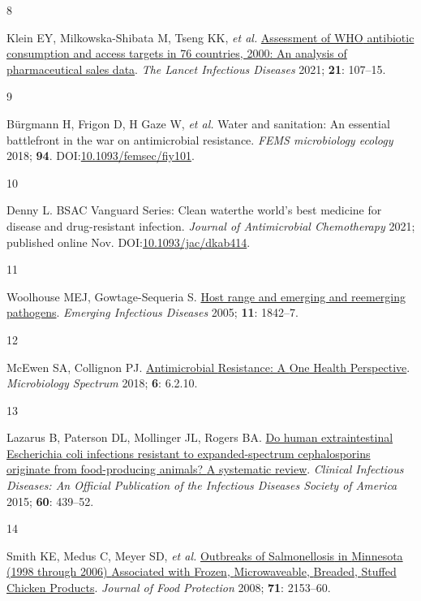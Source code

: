 \documentclass[
]{book}
\newlength{\cslhangindent}
\newlength{\csllabelwidth}
\newlength{\cslentryspacingunit} %
\newenvironment{CSLReferences}[2] %
 {%
  \setlength{\parindent}{0pt}
  \ifodd #1
  \let\oldpar\par
  \def\par{\hangindent=\cslhangindent\oldpar}
  \fi
  \setlength{\parskip}{#2\cslentryspacingunit}
 }%
 {}
\newcommand{\CSLLeftMargin}[1]{\parbox[t]{\csllabelwidth}{#1}}
\newcommand{\CSLRightInline}[1]{\parbox[t]{\linewidth - \csllabelwidth}{#1}\break}
\begin{document}
\begin{CSLReferences}{0}{0}
\leavevmode{}%
\CSLLeftMargin{8 }
\CSLRightInline{Klein EY, Milkowska-Shibata M, Tseng KK, \emph{et al.} \href{https://doi.org/10.1016/S1473-3099(20)30332-7}{Assessment of {WHO} antibiotic consumption and access targets in 76 countries, 2000\textendash 15: An analysis of pharmaceutical sales data}. \emph{The Lancet Infectious Diseases} 2021; \textbf{21}: 107--15.}

\leavevmode{}%
\CSLLeftMargin{9 }
\CSLRightInline{Bürgmann H, Frigon D, H Gaze W, \emph{et al.} Water and sanitation: An essential battlefront in the war on antimicrobial resistance. \emph{FEMS microbiology ecology} 2018; \textbf{94}. DOI:\href{https://doi.org/10.1093/femsec/fiy101}{10.1093/femsec/fiy101}.}

\leavevmode{}%
\CSLLeftMargin{10 }
\CSLRightInline{Denny L. {BSAC Vanguard Series}: {Clean} water\textemdash the world's best medicine for disease and drug-resistant infection. \emph{Journal of Antimicrobial Chemotherapy} 2021; published online Nov. DOI:\href{https://doi.org/10.1093/jac/dkab414}{10.1093/jac/dkab414}.}

\leavevmode{}%
\CSLLeftMargin{11 }
\CSLRightInline{Woolhouse MEJ, Gowtage-Sequeria S. \href{https://doi.org/10.3201/eid1112.050997}{Host range and emerging and reemerging pathogens}. \emph{Emerging Infectious Diseases} 2005; \textbf{11}: 1842--7.}

\leavevmode{}%
\CSLLeftMargin{12 }
\CSLRightInline{McEwen SA, Collignon PJ. \href{https://doi.org/10.1128/microbiolspec.ARBA-0009-2017}{Antimicrobial {Resistance}: A {One Health Perspective}}. \emph{Microbiology Spectrum} 2018; \textbf{6}: 6.2.10.}

\leavevmode{}%
\CSLLeftMargin{13 }
\CSLRightInline{Lazarus B, Paterson DL, Mollinger JL, Rogers BA. \href{https://doi.org/10.1093/cid/ciu785}{Do human extraintestinal {Escherichia} coli infections resistant to expanded-spectrum cephalosporins originate from food-producing animals? {A} systematic review}. \emph{Clinical Infectious Diseases: An Official Publication of the Infectious Diseases Society of America} 2015; \textbf{60}: 439--52.}

\leavevmode{}%
\CSLLeftMargin{14 }
\CSLRightInline{Smith KE, Medus C, Meyer SD, \emph{et al.} \href{https://doi.org/10.4315/0362-028X-71.10.2153}{Outbreaks of {Salmonellosis} in {Minnesota} (1998 through 2006) {Associated} with {Frozen}, {Microwaveable}, {Breaded}, {Stuffed Chicken Products}}. \emph{Journal of Food Protection} 2008; \textbf{71}: 2153--60.}


\end{CSLReferences}
\end{document}

